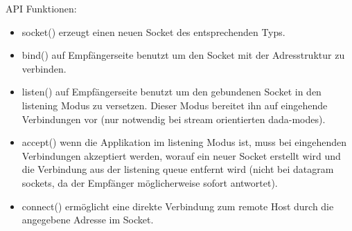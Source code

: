 \documentclass[12pt,a4paper]{report}
\begin{document}
\newpage
API Funktionen:
\begin{itemize}
	\item socket() erzeugt einen neuen Socket des entsprechenden Typs.
	\item bind() auf Empfängerseite benutzt um den Socket mit der Adresstruktur zu verbinden.
	\item listen() auf Empfängerseite benutzt um den gebundenen Socket in den listening Modus zu versetzen. Dieser Modus bereitet ihn auf eingehende Verbindungen vor (nur notwendig bei stream orientierten dada-modes).
	\item accept() wenn die Applikation im listening Modus ist, muss bei eingehenden Verbindungen akzeptiert werden, worauf ein neuer Socket erstellt wird und die Verbindung aus der listening queue entfernt wird (nicht bei datagram sockets, da der Empfänger möglicherweise sofort antwortet).
	\item connect() ermöglicht eine direkte Verbindung zum remote Host durch die angegebene Adresse im Socket.
\end{itemize}
\end{document}
